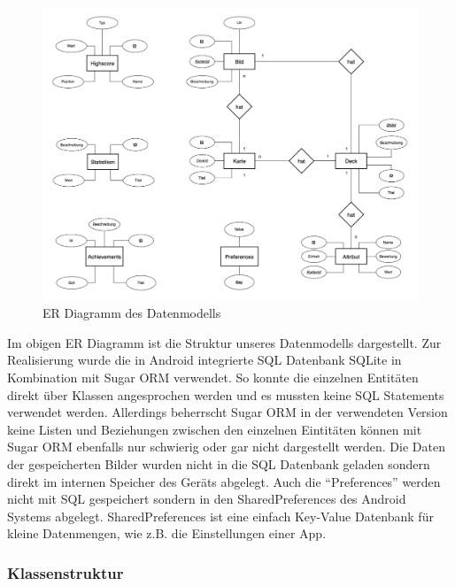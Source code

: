 \documentclass{scrartcl}
\begin{document}
\begin{figure}[h]
  \centering
  \includegraphics[width=\textwidth]{img/map_er.png}
  \caption{ER Diagramm des Datenmodells}
\end{figure}

\noindent
Im obigen ER Diagramm ist die Struktur unseres Datenmodells dargestellt. Zur
Realisierung wurde die in Android integrierte SQL Datenbank SQLite in
Kombination mit Sugar ORM verwendet. So konnte die einzelnen Entitäten direkt
über Klassen angesprochen werden und es mussten keine SQL Statements verwendet
werden. Allerdings beherrscht Sugar ORM in der verwendeten Version keine Listen
und Beziehungen zwischen den einzelnen Eintitäten können mit Sugar ORM ebenfalls
nur schwierig oder gar nicht dargestellt werden. Die Daten der gespeicherten
Bilder wurden nicht in die SQL Datenbank geladen sondern direkt im internen
Speicher des Geräts abgelegt. Auch die \enquote{Preferences} werden nicht mit
SQL gespeichert sondern in den SharedPreferences des Android Systems abgelegt.
SharedPreferences ist eine einfach Key-Value Datenbank für kleine Datenmengen,
wie z.B. die Einstellungen einer App.

\subsubsection{Klassenstruktur}
\end{document}
